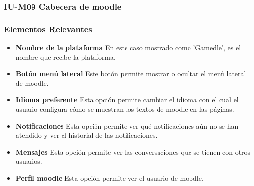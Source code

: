 
\subsubsection{IU-M09 Cabecera de moodle}


\subsubsection{Elementos Relevantes}

    \begin{itemize}
        \item {\bf Nombre de la plataforma}
            En este caso mostrado como 'Gamedle', es el nombre que recibe la plataforma.
        \item {\bf Botón menú lateral}
            Este botón permite mostrar o ocultar el menú lateral de moodle.
        \item {\bf Idioma preferente}
            Esta opción permite cambiar el idioma con el cual el usuario configura cómo se muestran los textos de moodle en las páginas.
        \item {\bf Notificaciones}
            Esta opción permite ver qué notificaciones aún no se han atendido y ver el historial de las notificaciones.
        \item {\bf Mensajes}
            Esta opción permite ver las conversaciones que se tienen con otros usuarios.
        \item {\bf Perfil moodle}
            Esta opción permite ver el usuario de moodle.
    \end{itemize}


\clearpage

